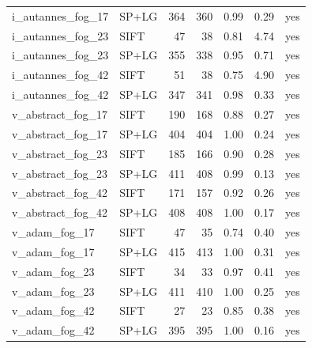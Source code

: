\begin{longtable}{llrrrrr}
i\_autannes\_fog\_17 & SP+LG & 364 & 360 & 0.99 & 0.29 & yes \\
i\_autannes\_fog\_23 & SIFT & 47 & 38 & 0.81 & 4.74 & yes \\
i\_autannes\_fog\_23 & SP+LG & 355 & 338 & 0.95 & 0.71 & yes \\
i\_autannes\_fog\_42 & SIFT & 51 & 38 & 0.75 & 4.90 & yes \\
i\_autannes\_fog\_42 & SP+LG & 347 & 341 & 0.98 & 0.33 & yes \\
v\_abstract\_fog\_17 & SIFT & 190 & 168 & 0.88 & 0.27 & yes \\
v\_abstract\_fog\_17 & SP+LG & 404 & 404 & 1.00 & 0.24 & yes \\
v\_abstract\_fog\_23 & SIFT & 185 & 166 & 0.90 & 0.28 & yes \\
v\_abstract\_fog\_23 & SP+LG & 411 & 408 & 0.99 & 0.13 & yes \\
v\_abstract\_fog\_42 & SIFT & 171 & 157 & 0.92 & 0.26 & yes \\
v\_abstract\_fog\_42 & SP+LG & 408 & 408 & 1.00 & 0.17 & yes \\
v\_adam\_fog\_17 & SIFT & 47 & 35 & 0.74 & 0.40 & yes \\
v\_adam\_fog\_17 & SP+LG & 415 & 413 & 1.00 & 0.31 & yes \\
v\_adam\_fog\_23 & SIFT & 34 & 33 & 0.97 & 0.41 & yes \\
v\_adam\_fog\_23 & SP+LG & 411 & 410 & 1.00 & 0.25 & yes \\
v\_adam\_fog\_42 & SIFT & 27 & 23 & 0.85 & 0.38 & yes \\
v\_adam\_fog\_42 & SP+LG & 395 & 395 & 1.00 & 0.16 & yes \\
\end{longtable}\endgroup
